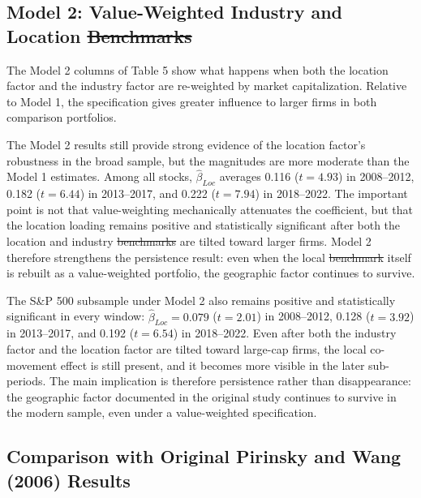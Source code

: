 \documentclass[
  12pt,
]{article}
\providecommand{\DIFaddtex}[1]{{\protect\color{blue}\uwave{#1}}} %
\providecommand{\DIFdeltex}[1]{{\protect\color{red}\sout{#1}}}                      %
\providecommand{\DIFaddbegin}{} %
\providecommand{\DIFaddend}{} %
\providecommand{\DIFdelbegin}{} %
\providecommand{\DIFdelend}{} %
\providecommand{\DIFadd}[1]{\texorpdfstring{\DIFaddtex{#1}}{#1}} %
\providecommand{\DIFdel}[1]{\texorpdfstring{\DIFdeltex{#1}}{}} %
\newcommand{\DIFscaledelfig}{0.5}
\newlength{\DIFdelgraphicswidth} %
\newlength{\DIFdelgraphicsheight} %
\newcommand{\DIFaddincludegraphics}[2][]{{\color{blue}\fbox{\DIFOincludegraphics[#1]{#2}}}} %
\newcommand{\DIFdelincludegraphics}[2][]{%
\sbox{\DIFdelgraphicsbox}{\DIFOincludegraphics[#1]{#2}}%
\settoboxwidth{\DIFdelgraphicswidth}{\DIFdelgraphicsbox} %
\settoboxtotalheight{\DIFdelgraphicsheight}{\DIFdelgraphicsbox} %
\scalebox{\DIFscaledelfig}{%
\parbox[b]{\DIFdelgraphicswidth}{\usebox{\DIFdelgraphicsbox}\\[-\baselineskip] \rule{\DIFdelgraphicswidth}{0em}}\llap{\resizebox{\DIFdelgraphicswidth}{\DIFdelgraphicsheight}{%
\setlength{\unitlength}{\DIFdelgraphicswidth}%
\begin{picture}(1,1)%
\thicklines\linethickness{2pt} %
{\color[rgb]{1,0,0}\put(0,0){\framebox(1,1){}}}%
{\color[rgb]{1,0,0}\put(0,0){\line( 1,1){1}}}%
{\color[rgb]{1,0,0}\put(0,1){\line(1,-1){1}}}%
\end{picture}%
}\hspace*{3pt}}} %
} %
\DeclareRobustCommand{\DIFaddbegin}{\DIFOaddbegin \let\includegraphics\DIFaddincludegraphics} %
\DeclareRobustCommand{\DIFaddend}{\DIFOaddend \let\includegraphics\DIFOincludegraphics} %
\DeclareRobustCommand{\DIFdelbegin}{\DIFOdelbegin \let\includegraphics\DIFdelincludegraphics} %
\DeclareRobustCommand{\DIFdelend}{\DIFOaddend \let\includegraphics\DIFOincludegraphics} %
\begin{document}
\subsection{Model 2: Value-Weighted Industry and Location
\DIFdelbegin \DIFdel{Benchmarks}\DIFdelend \DIFaddbegin \DIFadd{Indexes}\DIFaddend }\DIFdelbegin %
\DIFdelend \DIFaddbegin \label{model-2-value-weighted-industry-and-location-indexes}
\DIFaddend 

The Model 2 columns of Table 5 show what happens when both the location
factor and the industry factor are re-weighted by market capitalization.
Relative to Model 1, the specification gives greater influence to larger
firms in both comparison portfolios.

The Model 2 results still provide strong evidence of the location
factor's robustness in the broad sample, but the magnitudes are more
moderate than the Model 1 estimates. Among all stocks,
\(\hat{\beta}_{Loc}\) averages 0.116 (\(t=4.93\)) in 2008--2012, 0.182
(\(t=6.44\)) in 2013--2017, and 0.222 (\(t=7.94\)) in 2018--2022. The
important point is not that value-weighting mechanically attenuates the
coefficient, but that the location loading remains positive and
statistically significant after both the location and industry \DIFdelbegin \DIFdel{benchmarks }\DIFdelend \DIFaddbegin \DIFadd{indexes
}\DIFaddend are tilted toward larger firms. Model 2 therefore strengthens the
persistence result: even when the local \DIFdelbegin \DIFdel{benchmark }\DIFdelend \DIFaddbegin \DIFadd{index }\DIFaddend itself is rebuilt as a
value-weighted portfolio, the geographic factor continues to survive.

The S\&P 500 subsample under Model 2 also remains positive and
statistically significant in every window: \(\hat{\beta}_{Loc}=0.079\)
(\(t=2.01\)) in 2008--2012, 0.128 (\(t=3.92\)) in 2013--2017, and 0.192
(\(t=6.54\)) in 2018--2022. Even after both the industry factor and the
location factor are tilted toward large-cap firms, the local co-movement
effect is still present, and it becomes more visible in the later
sub-periods. The main implication is therefore persistence rather than
disappearance: the geographic factor documented in the original study
continues to survive in the modern sample, even under a value-weighted
specification.

\subsection{Comparison with Original Pirinsky and Wang (2006)
Results}\label{comparison-with-original-pirinsky-and-wang-2006-results}
\end{document}
